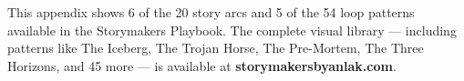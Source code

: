 \begin{center}
\begin{minipage}[t]{0.45\textwidth}
\end{minipage}
\end{center}

\vspace{12pt}

\begin{insightbox}
This appendix shows 6 of the 20 story arcs and 5 of the 54 loop patterns available in the Storymakers Playbook. The complete visual library --- including patterns like The Iceberg, The Trojan Horse, The Pre-Mortem, The Three Horizons, and 45 more --- is available at \textbf{storymakersbyanlak.com}.
\end{insightbox}

\clearpage

